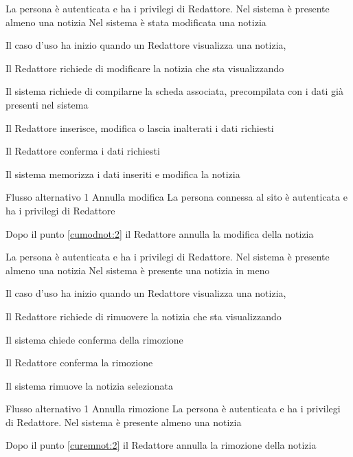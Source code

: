 {}
{La persona è autenticata e ha i privilegi di Redattore. Nel sistema è presente almeno una notizia}
{Nel sistema è stata modificata una notizia}
{\begin{enumCU}
	\item Il caso d'uso ha inizio quando un Redattore visualizza una notizia, 
	\item Il Redattore richiede di modificare la notizia che sta visualizzando
	\item Il sistema richiede di compilarne la scheda associata, precompilata con i dati già presenti nel sistema 
	\item Il Redattore inserisce, modifica o lascia inalterati i dati richiesti \label{cumodnot:2}
	\item Il Redattore conferma i dati richiesti
	\item Il sistema memorizza i dati inseriti e modifica la notizia
\end{enumCU}}
%
{Flusso alternativo 1}%
{Annulla modifica}%
{La persona connessa al sito è autenticata e ha i privilegi di Redattore}%
{\postNulle}%
{\begin{enumCU}
		\item Dopo il punto \ref{cumodnot:2} il Redattore annulla la modifica della notizia
\end{enumCU}}%

\tabcuvspace

{}
{La persona è autenticata e ha i privilegi di Redattore. Nel sistema è presente almeno una notizia}
{Nel sistema è presente una notizia in meno}
{\begin{enumCU}
	\item Il caso d'uso ha inizio quando un Redattore visualizza una notizia, 
	\item Il Redattore richiede di rimuovere la notizia che sta visualizzando
	\item Il sistema chiede conferma della rimozione \label{curemnot:2}
	\item Il Redattore conferma la rimozione
	\item Il sistema rimuove la notizia selezionata
\end{enumCU}}
%
{Flusso alternativo 1}%
{Annulla rimozione}%
{La persona è autenticata e ha i privilegi di Redattore. Nel sistema è presente almeno una notizia}%
{\postNulle}%
{\begin{enumCU}
		\item Dopo il punto \ref{curemnot:2} il Redattore annulla la rimozione della notizia
	\end{enumCU}}%

